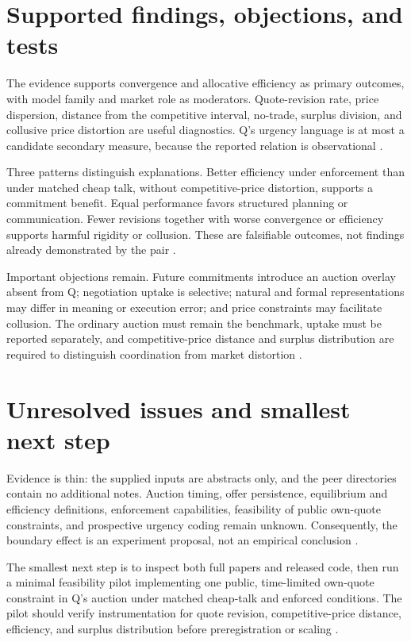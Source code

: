 \documentclass{article}
\begin{document}
\section{Supported findings, objections, and tests}

The evidence supports convergence and allocative efficiency as primary outcomes, with model family and market role as moderators.  Quote-revision rate, price dispersion, distance from the competitive interval, no-trade, surplus division, and collusive price distortion are useful diagnostics.  Q's urgency language is at most a candidate secondary measure, because the reported relation is observational .

Three patterns distinguish explanations.  Better efficiency under enforcement than under matched cheap talk, without competitive-price distortion, supports a commitment benefit.  Equal performance favors structured planning or communication.  Fewer revisions together with worse convergence or efficiency supports harmful rigidity or collusion.  These are falsifiable outcomes, not findings already demonstrated by the pair .

Important objections remain.  Future commitments introduce an auction overlay absent from Q; negotiation uptake is selective; natural and formal representations may differ in meaning or execution error; and price constraints may facilitate collusion.  The ordinary auction must remain the benchmark, uptake must be reported separately, and competitive-price distance and surplus distribution are required to distinguish coordination from market distortion .

\section{Unresolved issues and smallest next step}

Evidence is thin: the supplied inputs are abstracts only, and the peer directories contain no additional notes.  Auction timing, offer persistence, equilibrium and efficiency definitions, enforcement capabilities, feasibility of public own-quote constraints, and prospective urgency coding remain unknown.  Consequently, the boundary effect is an experiment proposal, not an empirical conclusion .

The smallest next step is to inspect both full papers and released code, then run a minimal feasibility pilot implementing one public, time-limited own-quote constraint in Q's auction under matched cheap-talk and enforced conditions.  The pilot should verify instrumentation for quote revision, competitive-price distance, efficiency, and surplus distribution before preregistration or scaling .
\end{document}
